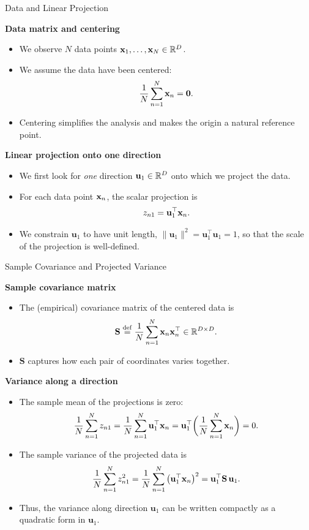 \documentclass[9pt]{beamer}
\begin{document}
\begin{frame}{Data and Linear Projection}

\textbf{Data matrix and centering}
\begin{itemize}
  \item We observe $N$ data points $\mathbf{x}_1, \dots, \mathbf{x}_N \in \mathbb{R}^D$.
  \item We assume the data have been centered:
  \[
    \frac{1}{N}\sum_{n=1}^N \mathbf{x}_n = \mathbf{0}.
  \]
  \item Centering simplifies the analysis and makes the origin a natural reference point.
\end{itemize}

\textbf{Linear projection onto one direction}
\begin{itemize}
  \item We first look for \emph{one} direction $\mathbf{u}_1 \in \mathbb{R}^D$ onto which we project the data.
  \item For each data point $\mathbf{x}_n$, the scalar projection is
  \[
    z_{n1} = \mathbf{u}_1^{\top} \mathbf{x}_n.
  \]
  \item We constrain $\mathbf{u}_1$ to have unit length, $\|\mathbf{u}_1\|^2 = \mathbf{u}_1^{\top}\mathbf{u}_1 = 1$, so that the scale of the projection is well-defined.
\end{itemize}

\end{frame}


\begin{frame}{Sample Covariance and Projected Variance}

\textbf{Sample covariance matrix}
\begin{itemize}
  \item The (empirical) covariance matrix of the centered data is
  \[
    \mathbf{S} \stackrel{\mathrm{def}}{=} \frac{1}{N}\sum_{n=1}^N \mathbf{x}_n \mathbf{x}_n^{\top} \in \mathbb{R}^{D \times D}.
  \]
  \item $\mathbf{S}$ captures how each pair of coordinates varies together.
\end{itemize}

\textbf{Variance along a direction}
\begin{itemize}
  \item The sample mean of the projections is zero:
  \[
    \frac{1}{N}\sum_{n=1}^N z_{n1}
    = \frac{1}{N}\sum_{n=1}^N \mathbf{u}_1^{\top}\mathbf{x}_n
    = \mathbf{u}_1^{\top}\bigg(\frac{1}{N}\sum_{n=1}^N \mathbf{x}_n\bigg)
    = 0.
  \]
  \item The sample variance of the projected data is
  \[
    \frac{1}{N}\sum_{n=1}^N z_{n1}^2
    = \frac{1}{N}\sum_{n=1}^N \big(\mathbf{u}_1^{\top}\mathbf{x}_n\big)^2
    = \mathbf{u}_1^{\top}\mathbf{S}\,\mathbf{u}_1.
  \]
  \item Thus, the variance along direction $\mathbf{u}_1$ can be written compactly as a quadratic form in $\mathbf{u}_1$.
\end{itemize}

\end{frame}
\end{document}
